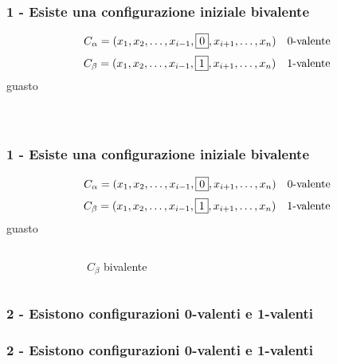\documentclass{beamer}
\begin{document}
\begin{frame}\frametitle{1 - Esiste una configurazione iniziale bivalente}
$$C_\alpha = (x_1,x_2,\ldots,x_{i-1},\fbox{0},x_{i+1},\ldots,x_n)\quad\mbox{0-valente}$$
$$C_\beta = (x_1,x_2,\ldots,x_{i-1},\fbox{1},x_{i+1},\ldots,x_n)\quad\mbox{1-valente}$$
\centering \scriptsize guasto$\quad\ $
\begin{columns}[c]
		\begin{figure}\centering\end{figure}
    		 \begin{center}\color{white}{$C_\beta$ bivalente}\end{center}
\end{columns}
\end{frame}

\begin{frame}\frametitle{1 - Esiste una configurazione iniziale bivalente}
$$C_\alpha = (x_1,x_2,\ldots,x_{i-1},\fbox{0},x_{i+1},\ldots,x_n)\quad\mbox{0-valente}$$
$$C_\beta = (x_1,x_2,\ldots,x_{i-1},\fbox{1},x_{i+1},\ldots,x_n)\quad\mbox{1-valente}$$
\centering \scriptsize guasto$\quad\ $
\begin{columns}[c]
		\begin{figure}\centering\end{figure}
    		\begin{center}$C_\beta$ bivalente\end{center}
\end{columns}
\end{frame}

\begin{frame}\frametitle{2 - Esistono configurazioni 0-valenti e 1-valenti}
\begin{center}\color{black}{$E_0$ configurazione con decisione 0}\end{center}
\begin{figure}\centering\end{figure}
\begin{center}\color{black}{analogamente per $E_1$ con decisione 1}\end{center}
\end{frame}

\begin{frame}\frametitle{2 - Esistono configurazioni 0-valenti e 1-valenti}
\begin{center}\color{black}{$E_0$ configurazione con decisione 0}\end{center}
\begin{figure}\centering\end{figure}
\begin{center}\color{black}{analogamente per $E_1$ con decisione 1}\end{center}
\end{frame}
\end{document}
